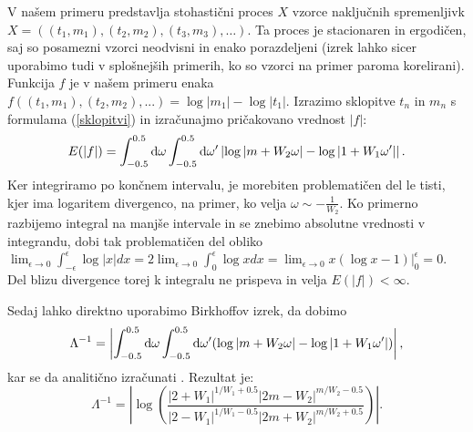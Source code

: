 V našem primeru predstavlja stohastični proces $X$ vzorce naključnih spremenljivk $X=((t_1,m_1),(t_2,m_2),(t_3,m_3), \dots)$. Ta proces je stacionaren in ergodičen, saj so posamezni vzorci neodvisni in enako porazdeljeni \cite{birkhoff} (izrek lahko sicer uporabimo tudi v splošnejših primerih, ko so vzorci na primer paroma korelirani).
Funkcija $f$ je v našem primeru enaka  $f((t_1,m_1),( t_2, m_2), ...) = \log |m_1| - \log |t_1|$.
Izrazimo sklopitve $t_n$ in $m_n$ s formulama (\ref{sklopitvi}) in izračunajmo pričakovano vrednost $|f|$:
\begin{equation}
E(|f|) = \int_{-0.5}^{0.5} \textup{d} \omega \int_{-0.5}^{0.5} \textup{d} \omega^\prime \left| \log | m + W_2 \omega | - \log | 1 + W_1 \omega^\prime | \right|.
\end{equation}
Ker integriramo po končnem intervalu, je morebiten problematičen del le tisti, kjer ima logaritem divergenco, na primer, ko velja $\omega \sim -\frac{1}{W_2}$. Ko primerno razbijemo integral na manjše intervale in se znebimo absolutne vrednosti v integrandu, dobi tak problematičen del obliko $\lim_{\epsilon \to 0} \int_{- \epsilon}^\epsilon \log |x| dx =  2 \lim_{\epsilon \to 0} \int_{0}^\epsilon \log x dx = \lim_{\epsilon \to 0} x (\log x - 1) \rvert_0^\epsilon = 0$. Del blizu divergence torej k integralu ne prispeva in velja $E(|f|) < \infty$.

Sedaj lahko direktno uporabimo Birkhoffov izrek, da dobimo
\begin{equation}
\Lambda^{-1} = \left| \int_{-0.5}^{0.5} \textup{d} \omega \int_{-0.5}^{0.5} \textup{d} \omega^\prime ( \log | m + W_2 \omega | - \log | 1 + W_1 \omega^\prime | ) \right|,
\end{equation}
kar se da analitično izračunati \cite{mondragon}. Rezultat je:
\begin{equation} \label{analiticnalok}
\Lambda^{-1} = \left| \log( \frac{|2+W_1|^{1/W_1 + 0.5} |2m - W_2|^{m/W_2 -0.5}}{|2-W_1|^{1/W_1-0.5} |2m + W_2|^{m/W_2 + 0.5}})\right|.
\end{equation}

